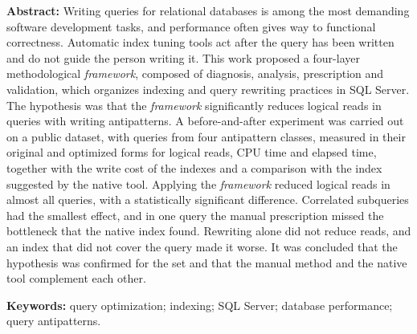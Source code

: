 \bigskip
\noindent\textbf{Abstract:} Writing queries for relational databases is among the most demanding software development tasks, and performance often gives way to functional correctness. Automatic index tuning tools act after the query has been written and do not guide the person writing it. This work proposed a four-layer methodological \textit{framework}, composed of diagnosis, analysis, prescription and validation, which organizes indexing and query rewriting practices in SQL Server. The hypothesis was that the \textit{framework} significantly reduces logical reads in queries with writing antipatterns. A before-and-after experiment was carried out on a public dataset, with queries from four antipattern classes, measured in their original and optimized forms for logical reads, CPU time and elapsed time, together with the write cost of the indexes and a comparison with the index suggested by the native tool. Applying the \textit{framework} reduced logical reads in almost all queries, with a statistically significant difference. Correlated subqueries had the smallest effect, and in one query the manual prescription missed the bottleneck that the native index found. Rewriting alone did not reduce reads, and an index that did not cover the query made it worse. It was concluded that the hypothesis was confirmed for the set and that the manual method and the native tool complement each other.

\medskip
\noindent\textbf{Keywords:} query optimization; indexing; SQL Server; database performance; query antipatterns.

\endgroup
